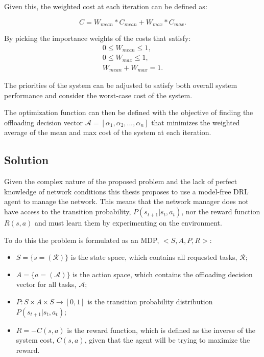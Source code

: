 \documentclass[conference]{IEEEtran}
\begin{document}
Given this, the weighted cost at each iteration can be defined as:

\begin{equation} \label{cost_function}
    C = W_{mean}*C_{mean} + W_{max}*C_{max}.
\end{equation}

By picking the importance weights of the costs that satisfy:
\begin{align*}
    0 \leq W_{mean} \leq 1, \\
    0 \leq W_{max} \leq 1,  \\
    W_{mean} + W_{max} = 1.
\end{align*}

The priorities of the system can be adjusted to satisfy both overall system performance and consider the worst-case cost of the system.

The optimization function can then be defined with the objective of finding the offloading decision vector $\mathcal{A} = [\alpha_1, \alpha_2, ..., \alpha_n]$ that minimizes the weighted average of the mean and max cost of the system at each iteration.

\subsection{Solution} \label{solution}
\noindent Given the complex nature of the proposed problem and the lack of perfect knowledge of network conditions this thesis proposes to use a model-free \acrshort{DRL} agent to manage the network. This means that the network manager does not have access to the transition probability, $P(s_{t+1}|s_t, a_t)$, nor the reward function $R(s, a)$ and must learn them by experimenting on the environment.

To do this the problem is formulated as an \acrshort{MDP}, $<S, A, P, R>$:
\begin{itemize}
    \item $S=\{s=(\mathcal{R})\}$ is the state space, which contains all requested tasks, $\mathcal{R}$;
    \item $A=\{a=(\mathcal{A})\}$ is the action space, which contains the offloading decision vector for all tasks, $\mathcal{A}$;
    \item $P:S \times A \times S \rightarrow [0, 1]$ is the transition probability distribution $P(s_{t+1}|s_t, a_t)$;
    \item $R = -C(s,a)$ is the reward function, which is defined as the inverse of the system cost, $C(s,a)$, given that the agent will be trying to maximize the reward.
\end{itemize}
\end{document}
